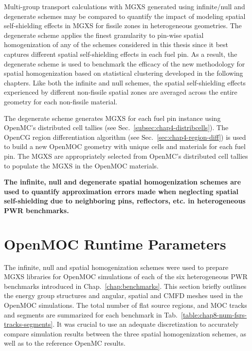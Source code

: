 Multi-group transport calculations with \ac{MGXS} generated using infinite/null and degenerate schemes may be compared to quantify the impact of modeling spatial self-shielding effects in \ac{MGXS} for fissile zones in heterogeneous geometries. The degenerate scheme applies the finest granularity to pin-wise spatial homogenization of any of the schemes considered in this thesis since it best captures different spatial self-shielding effects in each fuel pin. As a result, the degenerate scheme is used to benchmark the efficacy of the new methodology for spatial homogenization based on statistical clustering developed in the following chapters. Like both the infinite and null schemes, the spatial self-shielding effects experienced by different non-fissile spatial zones are averaged across the entire geometry for each non-fissile material.

The degenerate scheme generates \ac{MGXS} for each fuel pin instance using OpenMC's distributed cell tallies (see Sec.~\ref{subsec:chap4-distribcells}). The OpenCG region differentiation algorithm (see Sec.~\ref{sec:chap4-region-diff}) is used to build a new OpenMOC geometry with unique cells and materials for each fuel pin. The \ac{MGXS} are appropriately selected from OpenMC's distributed cell tallies to populate the \ac{MGXS} in the OpenMOC materials.

\begin{emphbox}
\textbf{The infinite, null and degenerate spatial homogenization schemes are used to quantify approximation errors made when neglecting spatial self-shielding due to neighboring pins, reflectors, etc. in heterogeneous \ac{PWR} benchmarks.}
\end{emphbox}


\section{OpenMOC Runtime Parameters}
\label{sec:chap8-moc-params}

The infinite, null and spatial homogenization schemes were used to prepare \ac{MGXS} libraries for OpenMOC simulations of each of the six heterogeneous \ac{PWR} benchmarks introduced in Chap.~\ref{chap:benchmarks}. This section briefly outlines the energy group structures and angular, spatial and \ac{CMFD} meshes used in the OpenMOC simulations. The total number of flat source regions, and \ac{MOC} tracks and segments are summarized for each benchmark in Tab.~\ref{table:chap8-num-fsrs-tracks-segments}. It was crucial to use an adequate discretization to accurately compare simulation results between the three spatial homogenization schemes, as well as to the reference OpenMC results.

